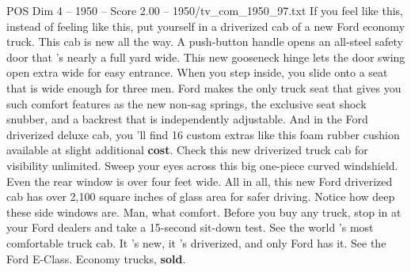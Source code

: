 \begin{textsample}{POS Dim 4 – 1950 – Score 2.00 – 1950/tv\_com\_1950\_97.txt}  \label{ex:f4_pos_089}
If you feel like this, instead of feeling like this, put yourself in a driverized cab of a new Ford economy truck.
This cab is new all the way.
A push-button handle opens an all-steel safety door that 's nearly a full yard wide.
This new gooseneck hinge lets the door swing open extra wide for easy entrance.
When you step inside, you slide onto a seat that is wide enough for three men.
Ford makes the only truck seat that gives you such comfort features as the new non-sag springs, the exclusive seat shock snubber, and a backrest that is independently adjustable.
And in the Ford driverized deluxe cab, you 'll find 16 custom extras like this foam rubber cushion available at slight additional \textbf{cost}.
Check this new driverized truck cab for visibility unlimited.
Sweep your eyes across this big one-piece curved windshield.
Even the rear window is over four feet wide.
All in all, this new Ford driverized cab has over 2,100 square inches of glass area for safer driving.
Notice how deep these side windows are.
Man, what comfort.
Before you buy any truck, stop in at your Ford dealers and take a 15-second sit-down test.
See the world 's most comfortable truck cab.
It 's new, it 's driverized, and only Ford has it.
See the Ford E-Class.
Economy trucks, \textbf{sold}.

\end{textsample}
